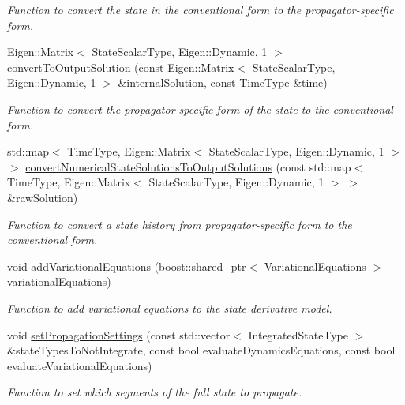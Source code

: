 \begin{DoxyCompactItemize}
\begin{DoxyCompactList}\small\item\em Function to convert the state in the conventional form to the propagator-\/specific form. \end{DoxyCompactList}\item 
Eigen\+::\+Matrix$<$ State\+Scalar\+Type, Eigen\+::\+Dynamic, 1 $>$ \hyperlink{classtudat_1_1propagators_1_1DynamicsStateDerivativeModel_a718840cf6f63a7c50db2a4fe7e51c33a}{convert\+To\+Output\+Solution} (const Eigen\+::\+Matrix$<$ State\+Scalar\+Type, Eigen\+::\+Dynamic, 1 $>$ \&internal\+Solution, const Time\+Type \&time)
\begin{DoxyCompactList}\small\item\em Function to convert the propagator-\/specific form of the state to the conventional form. \end{DoxyCompactList}\item 
std\+::map$<$ Time\+Type, Eigen\+::\+Matrix$<$ State\+Scalar\+Type, Eigen\+::\+Dynamic, 1 $>$ $>$ \hyperlink{classtudat_1_1propagators_1_1DynamicsStateDerivativeModel_a7f811fa19bc14d40f0b4d84c0723be69}{convert\+Numerical\+State\+Solutions\+To\+Output\+Solutions} (const std\+::map$<$ Time\+Type, Eigen\+::\+Matrix$<$ State\+Scalar\+Type, Eigen\+::\+Dynamic, 1 $>$ $>$ \&raw\+Solution)
\begin{DoxyCompactList}\small\item\em Function to convert a state history from propagator-\/specific form to the conventional form. \end{DoxyCompactList}\item 
void \hyperlink{classtudat_1_1propagators_1_1DynamicsStateDerivativeModel_ad3f8ddb1649a032fc3db60b4b34cf53c}{add\+Variational\+Equations} (boost\+::shared\+\_\+ptr$<$ \hyperlink{classtudat_1_1propagators_1_1VariationalEquations}{Variational\+Equations} $>$ variational\+Equations)
\begin{DoxyCompactList}\small\item\em Function to add variational equations to the state derivative model. \end{DoxyCompactList}\item 
void \hyperlink{classtudat_1_1propagators_1_1DynamicsStateDerivativeModel_a892a091b0906ce882f32f6dd6a202f4d}{set\+Propagation\+Settings} (const std\+::vector$<$ Integrated\+State\+Type $>$ \&state\+Types\+To\+Not\+Integrate, const bool evaluate\+Dynamics\+Equations, const bool evaluate\+Variational\+Equations)
\begin{DoxyCompactList}\small\item\em Function to set which segments of the full state to propagate. \end{DoxyCompactList}\item 

\end{DoxyCompactItemize}

